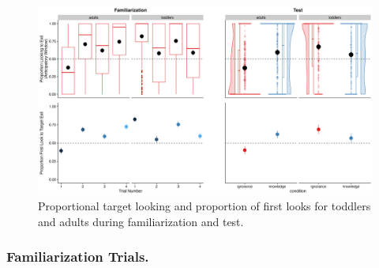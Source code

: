 \documentclass[
  english,
  man,floatsintext]{apa6}
\begin{document}
\begin{figure}

{\centering \includegraphics[width=6.8in]{Figure5} 

}

\caption{Proportional target looking and proportion of first looks for toddlers and adults during familiarization and test.}\label{fig:fig5}
\end{figure}

\hypertarget{familiarization-trials.}{%
\subsubsection{Familiarization Trials.}\label{familiarization-trials.}}
\end{document}

